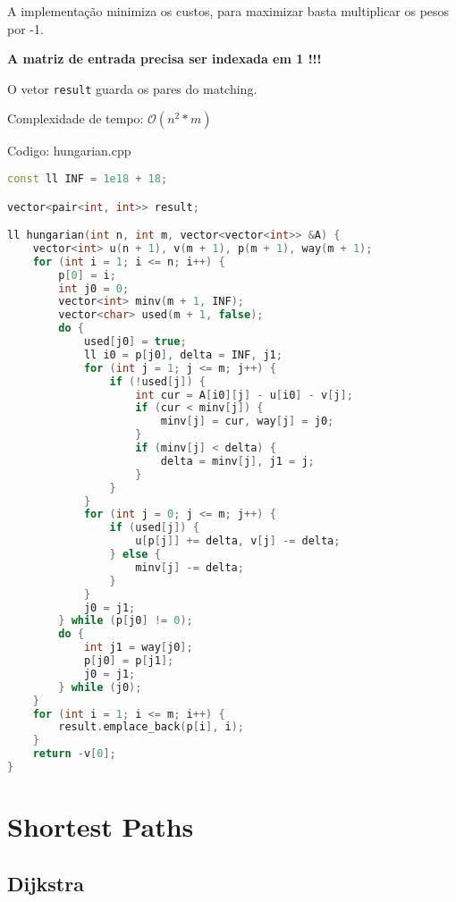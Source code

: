 \documentclass[10pt, a4paper, oneside]{book}
\begin{document}
A implementação minimiza os custos, para maximizar basta multiplicar os pesos por -1.



\textbf{A matriz de entrada precisa ser indexada em 1 !!!}



O vetor \lstinline{result} guarda os pares do matching.



Complexidade de tempo: $\mathcal{O}(n^2 * m)$

\hfill

Codigo: hungarian.cpp

\begin{lstlisting}[language=C++]
const ll INF = 1e18 + 18;

vector<pair<int, int>> result;

ll hungarian(int n, int m, vector<vector<int>> &A) {
    vector<int> u(n + 1), v(m + 1), p(m + 1), way(m + 1);
    for (int i = 1; i <= n; i++) {
        p[0] = i;
        int j0 = 0;
        vector<int> minv(m + 1, INF);
        vector<char> used(m + 1, false);
        do {
            used[j0] = true;
            ll i0 = p[j0], delta = INF, j1;
            for (int j = 1; j <= m; j++) {
                if (!used[j]) {
                    int cur = A[i0][j] - u[i0] - v[j];
                    if (cur < minv[j]) {
                        minv[j] = cur, way[j] = j0;
                    }
                    if (minv[j] < delta) {
                        delta = minv[j], j1 = j;
                    }
                }
            }
            for (int j = 0; j <= m; j++) {
                if (used[j]) {
                    u[p[j]] += delta, v[j] -= delta;
                } else {
                    minv[j] -= delta;
                }
            }
            j0 = j1;
        } while (p[j0] != 0);
        do {
            int j1 = way[j0];
            p[j0] = p[j1];
            j0 = j1;
        } while (j0);
    }
    for (int i = 1; i <= m; i++) {
        result.emplace_back(p[i], i);
    }
    return -v[0];
}
\end{lstlisting}
\hfill

\section{Shortest Paths}
\subsection{Dijkstra}
\end{document}

